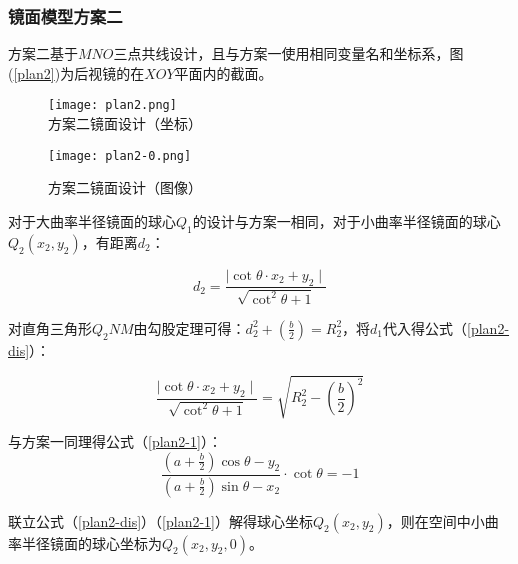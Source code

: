 \documentclass[withoutpreface,bwprint]{cumcmthesis} %
\begin{document}
\subsubsection{镜面模型方案二}

\par 方案二基于$MNO$三点共线设计，且与方案一使用相同变量名和坐标系，图(\ref{plan2})为后视镜的在$XOY$平面内的截面。


\begin{figure}[!htbp]  
\begin{minipage}[t]{0.5\textwidth}
\centering  
\texttt{[image: plan2.png]} \\
\caption{方案二镜面设计（坐标）} \label{plan2}
\end{minipage}
\hspace{1ex}
\begin{minipage}[t]{0.5\textwidth}  
\centering  
\texttt{[image: plan2-0.png]}\\
\caption{方案二镜面设计（图像）}  \label{plan2-0}
\end{minipage}  
\end{figure} 

\par 对于大曲率半径镜面的球心$Q_1$的设计与方案一相同，对于小曲率半径镜面的球心$Q_2(x_2,y_2)$，有距离$d_2$：

\begin{equation}
	d_2 = \frac{\mid \mathop{cot}\theta \cdot x_2 + y_2 \mid}{\sqrt{\mathop{cot}^{2} \theta + 1}} 
\end{equation}
\par 对直角三角形$Q_2NM$由勾股定理可得：$d_2^2 + \left( \frac{b}{2} \right) = R_2^2$，将$d_1$代入得公式（\ref{plan2-dis}）：

\begin{equation}
\label{plan2-dis}
	\frac{\mid \mathop{cot}\theta \cdot x_2 + y_2 \mid}{\sqrt{\mathop{cot}^{2} \theta + 1}} = \sqrt{R_2^2 - \left( \frac{b}{2} \right)^2} 	
\end{equation}
\par 与方案一同理得公式（\ref{plan2-1}）：
\begin{equation}
\label{plan2-1}
	\frac{\left(a + \frac{b}{2}\right) \mathop{cos} \theta - y_2}{\left( a+ \frac{b}{2} \right) \mathop{sin} \theta - x_2} \cdot \mathop{cot}\theta = -1
\end{equation}
\par 联立公式（\ref{plan2-dis}）（\ref{plan2-1}）解得球心坐标$Q_2(x_2,y_2)$，则在空间中小曲率半径镜面的球心坐标为$Q_2(x_2,y_2,0)$。
\end{document}
